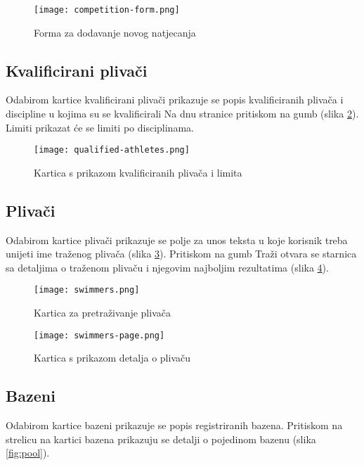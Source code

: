 \documentclass[times, utf8, zavrsni]{fer}
\begin{document}
\begin{figure}[!h]
    \centering
    \texttt{[image: competition-form.png]}
    \centering
    \caption{Forma za dodavanje novog natjecanja}
    \label{fig:competition-form}
\end{figure}

\subsection{Kvalificirani plivači}
Odabirom kartice kvalificirani plivači prikazuje se popis kvalificiranih plivača i discipline u kojima su se kvalificirali
Na dnu stranice pritiskom na gumb (slika \ref{fig:qualified-athletes}). Limiti prikazat će se limiti po disciplinama.

\begin{figure}[!h]
    \centering
    \texttt{[image: qualified-athletes.png]}
    \centering
    \caption{Kartica s prikazom kvalificiranih plivača i limita}
    \label{fig:qualified-athletes}
\end{figure}

\subsection{Plivači}
Odabirom kartice plivači prikazuje se polje za unos teksta u koje korisnik treba unijeti ime traženog plivača (slika \ref{fig:swimmers}).
Pritiskom na gumb Traži otvara se starnica sa detaljima o traženom plivaču i njegovim najboljim rezultatima (slika \ref{fig:swimmers-page}).

\begin{figure}[!h]
    \centering
    \texttt{[image: swimmers.png]}
    \centering
    \caption{Kartica za pretraživanje plivača}
    \label{fig:swimmers}
\end{figure}

\begin{figure}[!h]
    \centering
    \texttt{[image: swimmers-page.png]}
    \centering
    \caption{Kartica s prikazom detalja o plivaču}
    \label{fig:swimmers-page}
\end{figure}

\subsection{Bazeni}
Odabirom kartice bazeni prikazuje se popis registriranih bazena. Pritiskom na strelicu na kartici bazena prikazuju se detalji o pojedinom bazenu (slika \ref*{fig:pool}).
\end{document}
